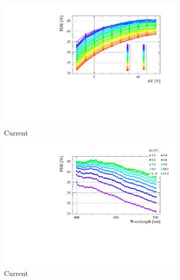 \begin{landscape}
\begin{figure}[htbp]
    \centering
    \begin{subfigure}{0.65\textwidth}
        \includegraphics[width=\linewidth]{gfx/plots/PDE/31epoxy/c_Current_Bias.pdf}  
        \caption{Current}
    \end{subfigure}
    \begin{subfigure}{0.65\textwidth}
        \includegraphics[width=\linewidth]{gfx/plots/PDE/31epoxy/c_Current_Wavelength.pdf}  
        \caption{Current}
    \end{subfigure}
    \\
    \begin{subfigure}{0.65\textwidth}

\end{subfigure}
\end{figure}
\end{landscape}
